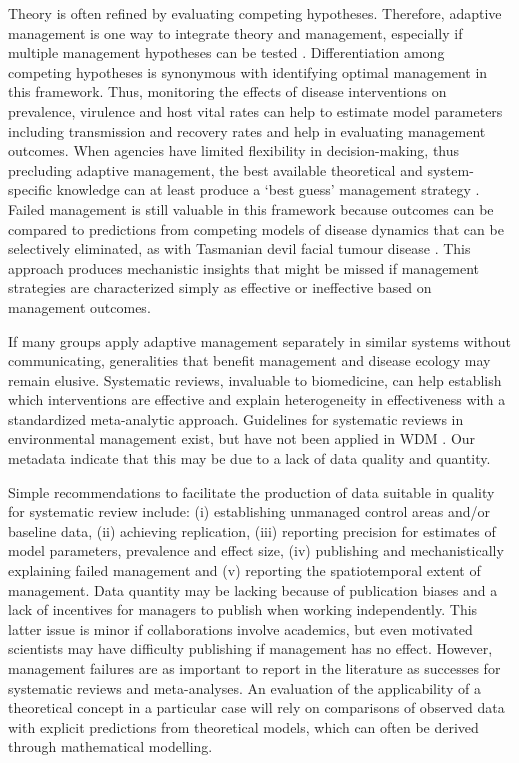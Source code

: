 Theory is often refined by evaluating competing hypotheses.
Therefore, adaptive management is one way to integrate theory and management, especially if multiple management hypotheses can be tested \citep{holling1978adaptive}.
Differentiation among competing hypotheses is synonymous with identifying optimal management in this framework.
Thus, monitoring the effects of disease interventions on prevalence, virulence and host vital rates can help to estimate model parameters including transmission and recovery rates and help in evaluating management outcomes.
When agencies have limited flexibility in decision-making, thus precluding adaptive management, the best available theoretical and system-specific knowledge can at least produce a ‘best guess’ management strategy \citep{Gregory2006b}.
Failed management is still valuable in this framework because outcomes can be compared to predictions from competing models of disease dynamics that can be selectively eliminated, as with Tasmanian devil facial tumour disease \citep{McDonald-Madden2010a}.
This approach produces mechanistic insights that might be missed if management strategies are characterized simply as effective or ineffective based on management outcomes.

If many groups apply adaptive management separately in similar systems without communicating, generalities that benefit management and disease ecology may remain elusive.
Systematic reviews, invaluable to biomedicine, can help establish which interventions are effective and explain heterogeneity in effectiveness with a standardized meta-analytic approach.
Guidelines for systematic reviews in environmental management exist, but have not been applied in WDM \citep{Pullin2006}.
Our metadata indicate that this may be due to a lack of data quality and quantity.

Simple recommendations to facilitate the production of data suitable in quality for systematic review include: (i) establishing unmanaged control areas and/or baseline data, (ii) achieving replication, (iii) reporting precision for estimates of model parameters, prevalence and effect size, (iv) publishing and mechanistically explaining failed management and (v) reporting the spatiotemporal extent of management.
Data quantity may be lacking because of publication biases and a lack of incentives for managers to publish when working independently.
This latter issue is minor if collaborations involve academics, but even motivated scientists may have difficulty publishing if management has no effect.
However, management failures are as important to report in the literature as successes for systematic reviews and meta-analyses.
An evaluation of the applicability of a theoretical concept in a particular case will rely on comparisons of observed data with explicit predictions from theoretical models, which can often be derived through mathematical modelling.

